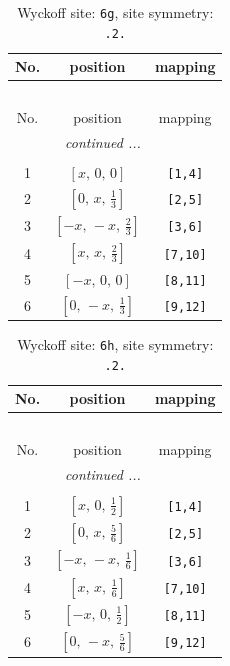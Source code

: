 \documentclass[fleqn,8pt]{jsarticle}
\begin{document}
\renewcommand{\arraystretch}{1.2}
\begin{longtable}{ccc}
\caption{Wyckoff site: {\tt 6g}, site symmetry: {\tt .2.}}
 \\
 \hline \hline
No. & position & mapping \\ \hline \endfirsthead

\multicolumn{2}{l}{\tablename\ \thetable{}} \\
 \hline \hline
No. & position & mapping \\ \hline \endhead

 \hline \hline
\multicolumn{2}{r}{\footnotesize\it continued ...} \\ \endfoot

 \hline \hline
\multicolumn{2}{r}{} \\ \endlastfoot

1 & $\left[ x,\, 0,\, 0 \right]$ & {\tt [1,4]} \\ \hline
2 & $\left[ 0,\, x,\, \frac{1}{3} \right]$ & {\tt [2,5]} \\ \hline
3 & $\left[ - x,\, - x,\, \frac{2}{3} \right]$ & {\tt [3,6]} \\ \hline
4 & $\left[ x,\, x,\, \frac{2}{3} \right]$ & {\tt [7,10]} \\ \hline
5 & $\left[ - x,\, 0,\, 0 \right]$ & {\tt [8,11]} \\ \hline
6 & $\left[ 0,\, - x,\, \frac{1}{3} \right]$ & {\tt [9,12]} \\
\end{longtable}
\renewcommand{\arraystretch}{1.2}
\begin{longtable}{ccc}
\caption{Wyckoff site: {\tt 6h}, site symmetry: {\tt .2.}}
 \\
 \hline \hline
No. & position & mapping \\ \hline \endfirsthead

\multicolumn{2}{l}{\tablename\ \thetable{}} \\
 \hline \hline
No. & position & mapping \\ \hline \endhead

 \hline \hline
\multicolumn{2}{r}{\footnotesize\it continued ...} \\ \endfoot

 \hline \hline
\multicolumn{2}{r}{} \\ \endlastfoot

1 & $\left[ x,\, 0,\, \frac{1}{2} \right]$ & {\tt [1,4]} \\ \hline
2 & $\left[ 0,\, x,\, \frac{5}{6} \right]$ & {\tt [2,5]} \\ \hline
3 & $\left[ - x,\, - x,\, \frac{1}{6} \right]$ & {\tt [3,6]} \\ \hline
4 & $\left[ x,\, x,\, \frac{1}{6} \right]$ & {\tt [7,10]} \\ \hline
5 & $\left[ - x,\, 0,\, \frac{1}{2} \right]$ & {\tt [8,11]} \\ \hline
6 & $\left[ 0,\, - x,\, \frac{5}{6} \right]$ & {\tt [9,12]} \\
\end{longtable}
\end{document}
